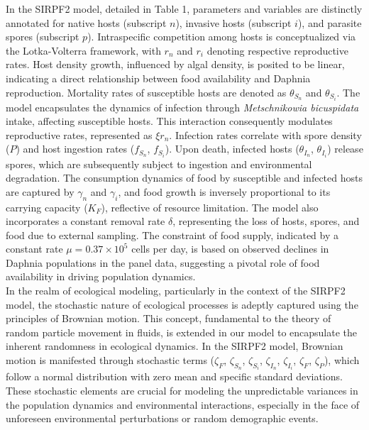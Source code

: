\documentclass[12pt]{article}
\begin{document}
In the SIRPF2 model, detailed in Table 1, parameters and variables are distinctly annotated for native hosts (subscript $n$), invasive hosts (subscript $i$), and parasite spores (subscript $p$). Intraspecific competition among hosts is conceptualized via the Lotka-Volterra framework, with $r_n$ and $r_i$ denoting respective reproductive rates. Host density growth, influenced by algal density, is posited to be linear, indicating a direct relationship between food availability and Daphnia reproduction. Mortality rates of susceptible hosts are denoted as $\theta_{S_n}$ and $\theta_{S_i}$. The model encapsulates the dynamics of infection through \textit{Metschnikowia bicuspidata} intake, affecting susceptible hosts. This interaction consequently modulates reproductive rates, represented as $\xi r_n$. Infection rates correlate with spore density ($P$) and host ingestion rates ($f_{S_n}$, $f_{S_i}$). Upon death, infected hosts ($\theta_{I_n}$, $\theta_{I_i}$) release spores, which are subsequently subject to ingestion and environmental degradation. The consumption dynamics of food by susceptible and infected hosts are captured by $\gamma_n$ and $\gamma_i$, and food growth is inversely proportional to its carrying capacity ($K_F$), reflective of resource limitation. The model also incorporates a constant removal rate $\delta$, representing the loss of hosts, spores, and food due to external sampling. The constraint of food supply, indicated by a constant rate $\mu = 0.37 \times 10^5$ cells per day, is based on observed declines in Daphnia populations in the panel data, suggesting a pivotal role of food availability in driving population dynamics.\\

In the realm of ecological modeling, particularly in the context of the SIRPF2 model, the stochastic nature of ecological processes is adeptly captured using the principles of Brownian motion. This concept, fundamental to the theory of random particle movement in fluids, is extended in our model to encapsulate the inherent randomness in ecological dynamics. In the SIRPF2 model, Brownian motion is manifested through stochastic terms ($\zeta_F$, $\zeta_{S_n}$, $\zeta_{S_i}$, $\zeta_{I_n}$, $\zeta_{I_i}$, $\zeta_{F}$, $\zeta_P$), which follow a normal distribution with zero mean and specific standard deviations. These stochastic elements are crucial for modeling the unpredictable variances in the population dynamics and environmental interactions, especially in the face of unforeseen environmental perturbations or random demographic events.\\
\end{document}
